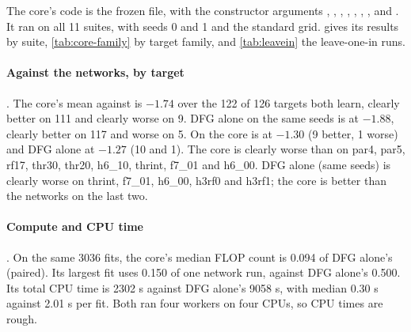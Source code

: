 The core's code is the frozen file, with the constructor arguments , , , , , , ,  and . It ran on all 11 suites, with seeds 0 and 1 and the standard grid.  gives its results by suite, \cref{tab:core-family} by target family, and \cref{tab:leavein} the leave-one-in runs.

\paragraph{Against the networks, by target} . The core's mean against  is $-1.74$ over the 122 of 126 targets both learn, clearly better on 111 and clearly worse on 9. DFG alone on the same seeds is at $-1.88$, clearly better on 117 and worse on 5. On  the core is at $-1.30$ (9 better, 1 worse) and DFG alone at $-1.27$ (10 and 1). The core is clearly worse than  on par4, par5, rf17, thr30, thr20, h6\_10, thrint, f7\_01 and h6\_00. DFG alone (same seeds) is clearly worse on thrint, f7\_01, h6\_00, h3rf0 and h3rf1; the core is better than the networks on the last two.

\paragraph{Compute and CPU time} . On the same 3036 fits, the core's median FLOP count is 0.094 of DFG alone's (paired). Its largest fit uses 0.150 of one network run, against DFG alone's 0.500. Its total CPU time is 2302 s against DFG alone's 9058 s, with median 0.30 s against 2.01 s per fit. Both ran four workers on four CPUs, so CPU times are rough.

